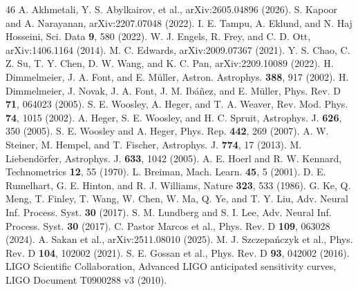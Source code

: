 \documentclass[reprint,aps,prd,floatfix,nofootinbib,superscriptaddress,showpacs]{revtex4-2}
\begin{document}
\begin{thebibliography}{46}
 A. Akhmetali, Y. S. Abylkairov, et al., arXiv:2605.04896 (2026).
 S. Kapoor and A. Narayanan, arXiv:2207.07048 (2022).
 I. E. Tampu, A. Eklund, and N. Haj Hosseini, Sci. Data \textbf{9}, 580 (2022).
 W. J. Engels, R. Frey, and C. D. Ott, arXiv:1406.1164 (2014).
 M. C. Edwards, arXiv:2009.07367 (2021).
 Y. S. Chao, C. Z. Su, T. Y. Chen, D. W. Wang, and K. C. Pan, arXiv:2209.10089 (2022).
 H. Dimmelmeier, J. A. Font, and E. M\"uller, Astron. Astrophys. \textbf{388}, 917 (2002).
 H. Dimmelmeier, J. Novak, J. A. Font, J. M. Ib\'a\~nez, and E. M\"uller, Phys. Rev. D \textbf{71}, 064023 (2005).
 S. E. Woosley, A. Heger, and T. A. Weaver, Rev. Mod. Phys. \textbf{74}, 1015 (2002).
 A. Heger, S. E. Woosley, and H. C. Spruit, Astrophys. J. \textbf{626}, 350 (2005).
 S. E. Woosley and A. Heger, Phys. Rep. \textbf{442}, 269 (2007).
 A. W. Steiner, M. Hempel, and T. Fischer, Astrophys. J. \textbf{774}, 17 (2013).
 M. Liebend\"orfer, Astrophys. J. \textbf{633}, 1042 (2005).
 A. E. Hoerl and R. W. Kennard, Technometrics \textbf{12}, 55 (1970).
 L. Breiman, Mach. Learn. \textbf{45}, 5 (2001).
 D. E. Rumelhart, G. E. Hinton, and R. J. Williams, Nature \textbf{323}, 533 (1986).
 G. Ke, Q. Meng, T. Finley, T. Wang, W. Chen, W. Ma, Q. Ye, and T. Y. Liu, Adv. Neural Inf. Process. Syst. \textbf{30} (2017).
 S. M. Lundberg and S. I. Lee, Adv. Neural Inf. Process. Syst. \textbf{30} (2017).
 C. Pastor Marcos et al., Phys. Rev. D \textbf{109}, 063028 (2024).
 A. Sakan et al., arXiv:2511.08010 (2025).
 M. J. Szczepa\'nczyk et al., Phys. Rev. D \textbf{104}, 102002 (2021).
 S. E. Gossan et al., Phys. Rev. D \textbf{93}, 042002 (2016).
 LIGO Scientific Collaboration, Advanced LIGO anticipated sensitivity curves, LIGO Document T0900288 v3 (2010).
\end{thebibliography}
\end{document}
